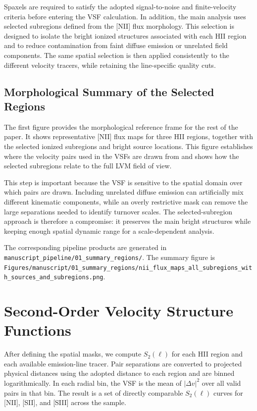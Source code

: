 Spaxels are required to satisfy the adopted signal-to-noise and finite-velocity
criteria before entering the VSF calculation. In addition, the main analysis
uses selected subregions defined from the [NII] flux morphology. This selection
is designed to isolate the bright ionized structures associated with each HII
region and to reduce contamination from faint diffuse emission or unrelated
field components. The same spatial selection is then applied consistently to
the different velocity tracers, while retaining the line-specific quality cuts.

\subsection{Morphological Summary of the Selected Regions}
\label{sec:summary-maps}

The first figure provides the morphological reference frame for the rest of the
paper. It shows representative [NII] flux maps for three HII regions, together
with the selected ionized subregions and bright source locations. This figure
establishes where the velocity pairs used in the VSFs are drawn from and shows
how the selected subregions relate to the full LVM field of view.

This step is important because the VSF is sensitive to the spatial domain over
which pairs are drawn. Including unrelated diffuse emission can artificially
mix different kinematic components, while an overly restrictive mask can remove
the large separations needed to identify turnover scales. The selected-subregion
approach is therefore a compromise: it preserves the main bright structures
while keeping enough spatial dynamic range for a scale-dependent analysis.

The corresponding pipeline products are generated in
\texttt{manuscript\_pipeline/01\_summary\_regions/}. The summary figure is
\texttt{Figures/manuscript/01\_summary\_regions/nii\_flux\_maps\_all\_subregions\_with\_sources\_and\_subregions.png}.

\section{Second-Order Velocity Structure Functions}
\label{sec:vsf2}

After defining the spatial masks, we compute $S_2(\ell)$ for each HII region
and each available emission-line tracer. Pair separations are converted to
projected physical distances using the adopted distance to each region and are
binned logarithmically. In each radial bin, the VSF is the mean of
$|\Delta v|^2$ over all valid pairs in that bin. The result is a set of
directly comparable $S_2(\ell)$ curves for [NII], [SII], and [SIII] across the
sample.

